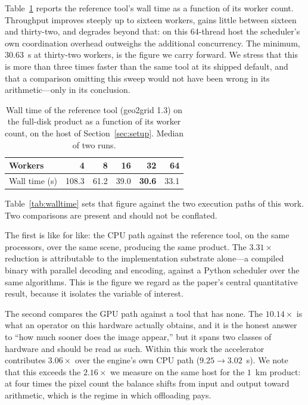 \documentclass{ametsocV6.1}
\begin{document}
Table~\ref{tab:sweep} reports the reference tool's wall time as a function of
its worker count. Throughput improves steeply up to sixteen workers, gains
little between sixteen and thirty-two, and degrades beyond that: on this
64-thread host the scheduler's own coordination overhead outweighs the
additional concurrency. The minimum, $30.63$~s at thirty-two workers, is the
figure we carry forward. We stress that this is more than three times faster
than the same tool at its shipped default, and that a comparison omitting this
sweep would not have been wrong in its arithmetic---only in its conclusion.

\begin{table}[t]
\caption{Wall time of the reference tool (geo2grid 1.3) on the full-disk
product as a function of its worker count, on the host of
Section~\ref{sec:setup}. Median of two runs.}\label{tab:sweep}
\centering
\begin{tabular}{lrrrrr}
\toprule
Workers & 4 & 8 & 16 & 32 & 64 \\
\midrule
Wall time (s) & 108.3 & 61.2 & 39.0 & \textbf{30.6} & 33.1 \\
\bottomrule
\end{tabular}
\end{table}

Table~\ref{tab:walltime} sets that figure against the two execution paths of
this work. Two comparisons are present and should not be conflated.

The first is like for like: the CPU path against the reference tool, on the
same processors, over the same scene, producing the same product. The
$3.31\times$ reduction is attributable to the implementation substrate alone---a
compiled binary with parallel decoding and encoding, against a Python
scheduler over the same algorithms. This is the figure we regard as the
paper's central quantitative result, because it isolates the variable of
interest.

The second compares the GPU path against a tool that has none. The
$10.14\times$ is what an operator on this hardware actually obtains, and it is
the honest answer to ``how much sooner does the image appear,'' but it spans
two classes of hardware and should be read as such. Within this work the
accelerator contributes $3.06\times$ over the engine's own CPU path
($9.25 \rightarrow 3.02$~s). We note that this exceeds the $2.16\times$ we
measure on the same host for the $1$~km product: at four times the pixel count
the balance shifts from input and output toward arithmetic, which is the
regime in which offloading pays.
\end{document}
